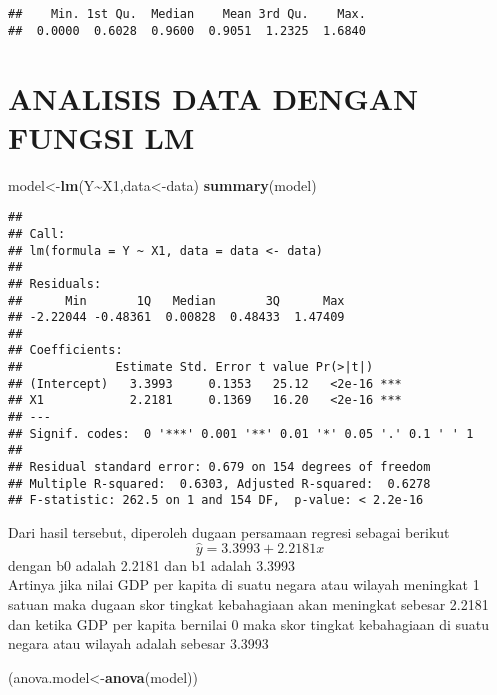 \documentclass[
]{article}
\newenvironment{Shaded}{\begin{snugshade}}{\end{snugshade}}
\newcommand{\FunctionTok}[1]{\textcolor[rgb]{0.13,0.29,0.53}{\textbf{#1}}}
\newcommand{\NormalTok}[1]{#1}
\newcommand{\OtherTok}[1]{\textcolor[rgb]{0.56,0.35,0.01}{#1}}
\newcommand{\SpecialCharTok}[1]{\textcolor[rgb]{0.81,0.36,0.00}{\textbf{#1}}}
\begin{document}
\begin{verbatim}
##    Min. 1st Qu.  Median    Mean 3rd Qu.    Max. 
##  0.0000  0.6028  0.9600  0.9051  1.2325  1.6840
\end{verbatim}

\hypertarget{analisis-data-dengan-fungsi-lm}{%
\section{\texorpdfstring{ ANALISIS DATA DENGAN FUNGSI
LM}{ ANALISIS DATA DENGAN FUNGSI LM}}\label{analisis-data-dengan-fungsi-lm}}

\begin{Shaded}
\begin{Highlighting}[]
\NormalTok{model}\OtherTok{\textless{}{-}}\FunctionTok{lm}\NormalTok{(Y}\SpecialCharTok{\textasciitilde{}}\NormalTok{X1,data}\OtherTok{\textless{}{-}}\NormalTok{data)}
\FunctionTok{summary}\NormalTok{(model)}
\end{Highlighting}
\end{Shaded}

\begin{verbatim}
## 
## Call:
## lm(formula = Y ~ X1, data = data <- data)
## 
## Residuals:
##      Min       1Q   Median       3Q      Max 
## -2.22044 -0.48361  0.00828  0.48433  1.47409 
## 
## Coefficients:
##             Estimate Std. Error t value Pr(>|t|)    
## (Intercept)   3.3993     0.1353   25.12   <2e-16 ***
## X1            2.2181     0.1369   16.20   <2e-16 ***
## ---
## Signif. codes:  0 '***' 0.001 '**' 0.01 '*' 0.05 '.' 0.1 ' ' 1
## 
## Residual standard error: 0.679 on 154 degrees of freedom
## Multiple R-squared:  0.6303, Adjusted R-squared:  0.6278 
## F-statistic: 262.5 on 1 and 154 DF,  p-value: < 2.2e-16
\end{verbatim}

Dari hasil tersebut, diperoleh dugaan persamaan regresi sebagai berikut
\[\hat{y}=3.3993+2.2181{x}\] dengan b0 adalah 2.2181 dan b1 adalah
3.3993\\
Artinya jika nilai GDP per kapita di suatu negara atau wilayah meningkat
1 satuan maka dugaan skor tingkat kebahagiaan akan meningkat sebesar
2.2181 dan ketika GDP per kapita bernilai 0 maka skor tingkat
kebahagiaan di suatu negara atau wilayah adalah sebesar 3.3993

\begin{Shaded}
\begin{Highlighting}[]
\NormalTok{(anova.model}\OtherTok{\textless{}{-}}\FunctionTok{anova}\NormalTok{(model))}
\end{Highlighting}
\end{Shaded}
\end{document}
